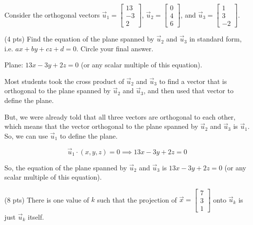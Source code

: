 \documentclass[11pt]{article}
\begin{document}
\newpage

\begin{prob}
Consider the orthogonal vectors $\vec u_1 = \begin{bmatrix} 13 \\ -3 \\ 2 \end{bmatrix}$, $\vec u_2 = \begin{bmatrix} 0 \\ 4 \\ 6 \end{bmatrix}$, and $\vec u_3 = \begin{bmatrix} 1 \\ 3 \\ -2 \end{bmatrix}$.

\begin{subprob}(4 pts) Find the equation of the plane spanned by $\vec u_2$ and $\vec u_3$ in standard form, i.e. $ax + by + cz + d = 0$. $\boxed{\text{Circle}}$ your final answer. \\

\begin{solution}
Plane: $13x - 3y + 2z = 0$ (or any scalar multiple of this equation).

Most students took the cross product of $\vec u_2$ and $\vec u_3$ to find a vector that is orthogonal to the plane spanned by $\vec u_2$ and $\vec u_3$, and then used that vector to define the plane.

But, we were already told that all three vectors are orthogonal to each other, which means that the vector orthogonal to the plane spanned by $\vec u_2$ and $\vec u_3$ is $\vec u_1$. So, we can use $\vec u_1$ to define the plane.

$$\vec u_1 \cdot (x, y, z) = 0 \implies 13x - 3y + 2z = 0$$

So, the equation of the plane spanned by $\vec u_2$ and $\vec u_3$ is $13x - 3y + 2z = 0$ (or any scalar multiple of this equation).

\end{solution}

\emptybox{4cm}

\end{subprob}

\begin{subprob}(8 pts) There is one value of $k$ such that the projection of $\vec x = \begin{bmatrix} 7 \\ 3 \\ 1 \end{bmatrix}$ onto $\vec u_k$ is just $\vec u_k$ itself.
  

\end{subprob}
\end{prob}
\end{document}
